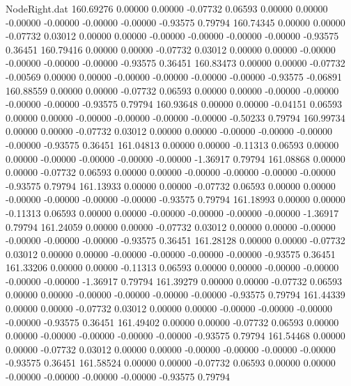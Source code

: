 \begin{filecontents}{NodeRight.dat}
 160.69276    0.00000    0.00000    -0.07732    0.06593    0.00000    0.00000   -0.00000   -0.00000   -0.00000   -0.00000   -0.93575    0.79794
 160.74345    0.00000    0.00000    -0.07732    0.03012    0.00000    0.00000   -0.00000   -0.00000   -0.00000   -0.00000   -0.93575    0.36451
 160.79416    0.00000    0.00000    -0.07732    0.03012    0.00000    0.00000   -0.00000   -0.00000   -0.00000   -0.00000   -0.93575    0.36451
 160.83473    0.00000    0.00000    -0.07732   -0.00569    0.00000    0.00000   -0.00000   -0.00000   -0.00000   -0.00000   -0.93575   -0.06891
 160.88559    0.00000    0.00000    -0.07732    0.06593    0.00000    0.00000   -0.00000   -0.00000   -0.00000   -0.00000   -0.93575    0.79794
 160.93648    0.00000    0.00000    -0.04151    0.06593    0.00000    0.00000   -0.00000   -0.00000   -0.00000   -0.00000   -0.50233    0.79794
 160.99734    0.00000    0.00000    -0.07732    0.03012    0.00000    0.00000   -0.00000   -0.00000   -0.00000   -0.00000   -0.93575    0.36451
 161.04813    0.00000    0.00000    -0.11313    0.06593    0.00000    0.00000   -0.00000   -0.00000   -0.00000   -0.00000   -1.36917    0.79794
 161.08868    0.00000    0.00000    -0.07732    0.06593    0.00000    0.00000   -0.00000   -0.00000   -0.00000   -0.00000   -0.93575    0.79794
 161.13933    0.00000    0.00000    -0.07732    0.06593    0.00000    0.00000   -0.00000   -0.00000   -0.00000   -0.00000   -0.93575    0.79794
 161.18993    0.00000    0.00000    -0.11313    0.06593    0.00000    0.00000   -0.00000   -0.00000   -0.00000   -0.00000   -1.36917    0.79794
 161.24059    0.00000    0.00000    -0.07732    0.03012    0.00000    0.00000   -0.00000   -0.00000   -0.00000   -0.00000   -0.93575    0.36451
 161.28128    0.00000    0.00000    -0.07732    0.03012    0.00000    0.00000   -0.00000   -0.00000   -0.00000   -0.00000   -0.93575    0.36451
 161.33206    0.00000    0.00000    -0.11313    0.06593    0.00000    0.00000   -0.00000   -0.00000   -0.00000   -0.00000   -1.36917    0.79794
 161.39279    0.00000    0.00000    -0.07732    0.06593    0.00000    0.00000   -0.00000   -0.00000   -0.00000   -0.00000   -0.93575    0.79794
 161.44339    0.00000    0.00000    -0.07732    0.03012    0.00000    0.00000   -0.00000   -0.00000   -0.00000   -0.00000   -0.93575    0.36451
 161.49402    0.00000    0.00000    -0.07732    0.06593    0.00000    0.00000   -0.00000   -0.00000   -0.00000   -0.00000   -0.93575    0.79794
 161.54468    0.00000    0.00000    -0.07732    0.03012    0.00000    0.00000   -0.00000   -0.00000   -0.00000   -0.00000   -0.93575    0.36451
 161.58524    0.00000    0.00000    -0.07732    0.06593    0.00000    0.00000   -0.00000   -0.00000   -0.00000   -0.00000   -0.93575    0.79794

\end{filecontents}
